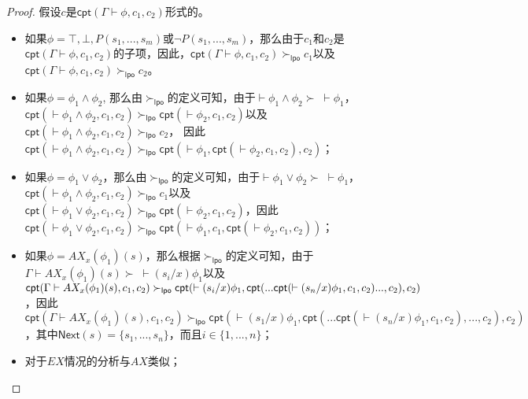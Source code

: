 \begin{proof}
	假设$c$是$\textsf{cpt}(\Gamma\vdash\phi,c_1,c_2)$形式的。
	\begin{itemize}
		\item 如果$\phi= \top, \bot,  P(s_1,...,s_m)$或$\neg P(s_1,...,s_m)$，那么由于$c_1$和$c_2$是$\textsf{cpt}(\Gamma\vdash\phi,c_1, c_2)$的子项，因此，$\textsf{cpt}(\Gamma\vdash\phi,c_1, c_2) \succ_{\mathsf{lpo}} c_1$以及$\textsf{cpt}(\Gamma\vdash\phi,c_1, c_2) \succ_{\mathsf{lpo}} c_2$。
		\item 如果$\phi = \phi_1\wedge\phi_2$, 那么由$\succ_{\mathsf{lpo}}$的定义可知，由于$\vdash\phi_1\wedge\phi_2 \succ \;\vdash\phi_1$， $\textsf{cpt}(\vdash\phi_1\wedge\phi_2, c_1, c_2)\succ_{\mathsf{lpo}} \textsf{cpt}(\vdash\phi_2, c_1, c_2)$以及 $\textsf{cpt}(\vdash\phi_1\wedge\phi_2, c_1, c_2)\succ_{\mathsf{lpo}} c_2$， 因此$\textsf{cpt}(\vdash\phi_1\wedge\phi_2, c_1, c_2)\succ_{\mathsf{lpo}} \textsf{cpt}(\vdash\phi_1, \textsf{cpt}(\vdash\phi_2, c_1, c_2), c_2)$；
		\item 如果$\phi = \phi_1\vee\phi_2$，那么由$\succ_{\mathsf{lpo}}$的定义可知，由于$\vdash\phi_1\vee\phi_2 \succ \;\vdash\phi_1$， $\textsf{cpt}(\vdash\phi_1\wedge\phi_2, c_1, c_2)\succ_{\mathsf{lpo}} c_1$以及$\textsf{cpt}(\vdash\phi_1\vee\phi_2, c_1, c_2)\succ_{\mathsf{lpo}} \textsf{cpt}(\vdash\phi_2, c_1, c_2)$，因此 $\textsf{cpt}(\vdash\phi_1\vee\phi_2, c_1, c_2)\succ_{\mathsf{lpo}} \textsf{cpt}(\vdash\phi_1, c_1, \textsf{cpt}(\vdash\phi_2, c_1, c_2))$；
		\item 如果$\phi =AX_x(\phi_1)(s)$，那么根据$\succ_{\mathsf{lpo}}$的定义可知，由于$\Gamma\vdash AX_x(\phi_1)(s)\succ\; \vdash(s_i/x)\phi_1$以及 $\textsf{cpt}(\Gamma\vdash AX_x(\phi_1)(s), c_1, c_2)\succ_{\mathsf{lpo}} \textsf{cpt}(\vdash(s_i/x)\phi_1, \textsf{cpt}(...\textsf{cpt}(\vdash(s_n/x)\phi_1, \\c_1, c_2)..., c_2), c_2)$，因此$\textsf{cpt}(\Gamma\vdash AX_x(\phi_1)(s), c_1, c_2) \succ_{\mathsf{lpo}} \textsf{cpt}(\vdash(s_1/x)\phi_1, \textsf{cpt}(...\textsf{cpt}(\vdash(s_n/x)\phi_1, c_1, c_2),...,c_2), c_2)$，其中$\textsf{Next}(s)=\{s_1,...,s_n\}$，而且$i\in\{1,...,n\}$；
		\item 对于$EX$情况的分析与$AX$类似；

\end{itemize}
\end{proof}
